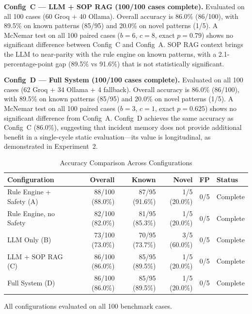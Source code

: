 \documentclass[a4paper,10pt,journal,compsoc]{IEEEtran}
\begin{document}
\textbf{Config~C --- LLM + SOP RAG (100/100 cases complete).}
Evaluated on all 100 cases (60 Groq + 40 Ollama). Overall accuracy
is 86.0\% (86/100), with 89.5\% on known patterns (85/95) and 20.0\%
on novel patterns (1/5). A McNemar test on all 100 paired cases
($b=6$, $c=8$, exact $p=0.79$) shows no significant difference
between Config~C and Config~A. SOP RAG context brings the LLM to
near-parity with the rule engine on known patterns, with a
2.1-percentage-point gap (89.5\% vs 91.6\%) that is not statistically
significant.

\textbf{Config~D --- Full System (100/100 cases complete).}
Evaluated on all 100 cases (62 Groq + 34 Ollama + 4 fallback).
Overall accuracy is 86.0\% (86/100), with 89.5\% on known patterns
(85/95) and 20.0\% on novel patterns (1/5). A McNemar test on all
100 paired cases ($b=3$, $c=1$, exact $p=0.625$) shows no significant
difference from Config~A. Config~D achieves the same accuracy as
Config~C (86.0\%), suggesting that incident memory does not provide
additional benefit in a single-cycle static evaluation---its value is
longitudinal, as demonstrated in Experiment~2.

\begin{table}[t]
  \caption{Accuracy Comparison Across Configurations}
  \label{tab:ablation}
  \centering
  \begin{tabular}{lrrrrl}
    \toprule
    \textbf{Configuration} & \textbf{Overall} & \textbf{Known} &
    \textbf{Novel} & \textbf{FP} & \textbf{Status} \\
    \midrule
    Rule Engine + Safety (A)  & 88/100 (88.0\%) & 87/95 (91.6\%) & 1/5 (20.0\%) & 0/5 & Complete \\
    Rule Engine, no Safety    & 82/100 (82.0\%) & 81/95 (85.3\%) & 1/5 (20.0\%) & 0/5 & Complete \\
    LLM Only (B)              & 73/100 (73.0\%) & 70/95 (73.7\%) & 3/5 (60.0\%) & 0/5 & Complete \\
    LLM + SOP RAG (C)         & 86/100 (86.0\%) & 85/95 (89.5\%) & 1/5 (20.0\%) & 0/5 & Complete \\
    Full System (D)           & 86/100 (86.0\%) & 85/95 (89.5\%) & 1/5 (20.0\%) & 0/5 & Complete \\
    \bottomrule
  \end{tabular}
  \smallskip

  {\footnotesize All configurations evaluated on all 100 benchmark cases.}
\end{table}
\end{document}
